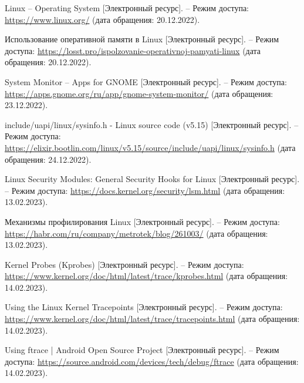 
\begingroup
\renewcommand{\section}[2]{}
\begin{thebibliography}{}

Linux -- Operating System [Электронный ресурс]. -- Режим доступа: \url {https://www.linux.org/} (дата обращения: 20.12.2022).

Использование оперативной памяти в Linux [Электронный ресурс]. -- Режим доступа: \url {https://losst.pro/ispolzovanie-operativnoj-pamyati-linux} (дата обращения: 20.12.2022).

System Monitor – Apps for GNOME [Электронный ресурс]. -- Режим доступа: \url {https://apps.gnome.org/ru/app/gnome-system-monitor/} (дата обращения: 23.12.2022).


include/uapi/linux/sysinfo.h - Linux source code (v5.15) [Электронный ресурс]. -- Режим доступа: \url {https://elixir.bootlin.com/linux/v5.15/source/include/uapi/linux/sysinfo.h} (дата обращения: 24.12.2022).


Linux Security Modules: General Security Hooks for Linux [Электронный ресурс]. -- Режим доступа: \url {https://docs.kernel.org/security/lsm.html} (дата обращения: 13.02.2023).


Механизмы профилирования Linux [Электронный ресурс]. -- Режим доступа: \url {https://habr.com/ru/company/metrotek/blog/261003/} (дата обращения: 13.02.2023).


Kernel Probes (Kprobes) [Электронный ресурс]. -- Режим доступа: \url {https://www.kernel.org/doc/html/latest/trace/kprobes.html} (дата обращения: 14.02.2023).


Using the Linux Kernel Tracepoints [Электронный ресурс]. -- Режим доступа: \url {https://www.kernel.org/doc/html/latest/trace/tracepoints.html} (дата обращения: 14.02.2023).


Using ftrace | Android Open Source Project [Электронный ресурс]. -- Режим доступа: \url {https://source.android.com/devices/tech/debug/ftrace} (дата обращения: 14.02.2023).


\end{thebibliography}
